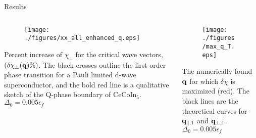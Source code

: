 \documentclass{beamer} %
\begin{document}
\begin{frame}{}
\begin{block}{\centering\veryHuge Results}
\begin{columns}[t]
\begin{column}{0.3\textwidth}
\begin{figure}
				 \label{fig:xx_cont}
				        \centering
				                \texttt{[image: ./figures/xx\_all\_enhanced\_q.eps]}
				 \end{figure}
				Percent increase of $\chi_{\perp}$ for the critical wave vectors, $(\delta\chi_{\perp}({\bf q}) \%)$. The black crosses outline the first 
				                order phase transition for a Pauli limited d-wave superconductor, and the bold red line is a qualitative sketch of the Q-phase boundary of 
				                CeCoIn$_5$. $\Delta_0 = 0.005\epsilon_f$
			 \end{column}
			 \vrule{}
			 \begin{column}{0.18\textwidth}
					 \begin{figure}
					        \centering
					                \texttt{[image: ./figures/max\_q\_T.eps]}
					 \end{figure}
					 The numerically found ${\bf q}$ for which $\delta\chi$ is maximized (red). The black
					                 lines are the theoretical curves for ${\bf q}_{\parallel,1}$ and ${\bf q}_{\perp,1}$. \\$\Delta_0 = 0.005\epsilon_f$
				\end{column}
			\end{columns}
 
		\end{block}
  \end{frame}
  
\end{document}

